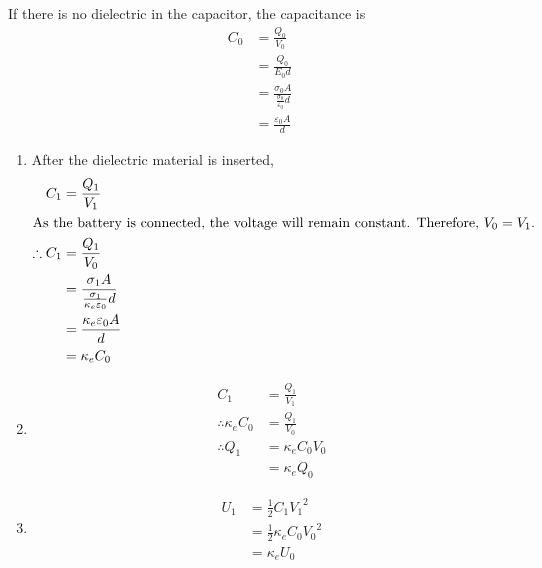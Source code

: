 \documentclass[fleqn, a4paper, 12pt, twoside]{article}
\theoremstyle{definition}
\theoremstyle{theorem}
\begin{document}
\begin{solution}
	If there is no dielectric in the capacitor, the capacitance is
	\begin{align*}
		C_0 & = \frac{Q_0}{V_0}                                     \\
                    & = \frac{Q_0}{E_0 d}                                   \\
                    & = \frac{\sigma_0 A}{\frac{\sigma_0}{\varepsilon_0} d} \\
                    & = \frac{\varepsilon_0 A}{d}
	\end{align*}
	\begin{enumerate}[leftmargin = *]
		\item
			After the dielectric material is inserted,
			\begin{align*}
				C_1            & = \frac{Q_1}{V_1}                                              \\
				\intertext{As the battery is connected, the voltage will remain constant. Therefore, $V_0 = V_1$.}
				\therefore C_1 & = \frac{Q_1}{V_0}                                              \\
                                               & = \frac{\sigma_1 A}{\frac{\sigma_1}{\kappa_e \varepsilon_0} d} \\
                                               & = \frac{\kappa_e \varepsilon_0 A}{d}                           \\
                                               & = \kappa_e C_0
			\end{align*}
		\item
			\begin{align*}
				C_1                     & = \frac{Q_1}{V_1}  \\
				\therefore \kappa_e C_0 & = \frac{Q_1}{V_0}  \\
				\therefore Q_1          & = \kappa_e C_0 V_0 \\
                                                        & = \kappa_e Q_0
			\end{align*}
		\item
			\begin{align*}
				U_1 & = \frac{1}{2} C_1 {V_1}^2          \\
                                    & = \frac{1}{2} \kappa_e C_0 {V_0}^2 \\
                                    & = \kappa_e U_0
			\end{align*}

\end{enumerate}
\end{solution}
\end{document}
